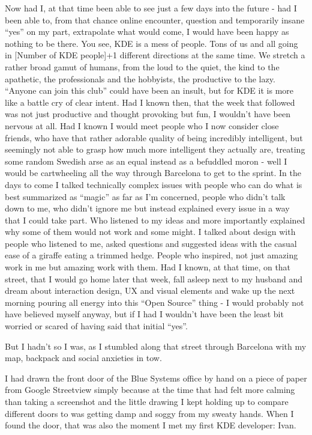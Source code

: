 Now had I, at that time been able to see just a few days into the future - had I been able to, from that chance online encounter, question and temporarily insane “yes” on my part, extrapolate what would come, I would have been happy as nothing to be there. 
You see, KDE is a mess of people. Tons of us and all going in [Number of KDE people]+1 different directions at the same time. We stretch a rather broad gamut of humans, from the loud to the quiet, the kind to the apathetic, the professionals and the hobbyists, the productive to the lazy. “Anyone can join this club” could have been an insult, but for KDE it is more like a battle cry of clear intent.
Had I known then, that the week that followed was not just productive and thought provoking but fun, I wouldn't have been nervous at all. Had I known I would meet people who I now consider close friends, who have that rather adorable quality of being incredibly intelligent, but seemingly not able to grasp how much more intelligent they actually are, treating some random Swedish arse as an equal instead as a befuddled moron - well I would be cartwheeling all the way through Barcelona to get to the sprint.
In the days to come I talked technically complex issues with people who can do what is best summarized as “magic” as far as I’m concerned, people who didn’t talk down to me, who didn’t ignore me but instead explained every issue in a way that I could take part. Who listened to my ideas and more importantly explained why some of them would not work and some might.
I talked about design with people who listened to me, asked questions and suggested ideas with the casual ease of a giraffe eating a trimmed hedge. People who inspired, not just amazing work in me but amazing work with them.
Had I known, at that time, on that street, that I would go home later that week, fall asleep next to my husband and dream about interaction design, UX and visual elements and wake up the next morning pouring all energy into this “Open Source” thing - I would probably not have believed myself anyway, but if I had I wouldn't have been the least bit worried or scared of having said that initial “yes”.

But I hadn't so I was, as I stumbled along that street through Barcelona with my map, backpack and social anxieties in tow.

I had drawn the front door of the Blue Systems office by hand on a piece of paper from Google Streetview simply because at the time that had felt more calming than taking a screenshot and the little drawing I kept holding up to compare different doors to was getting damp and soggy from my sweaty hands. When I found the door, that was also the moment I met my first KDE developer: Ivan.

